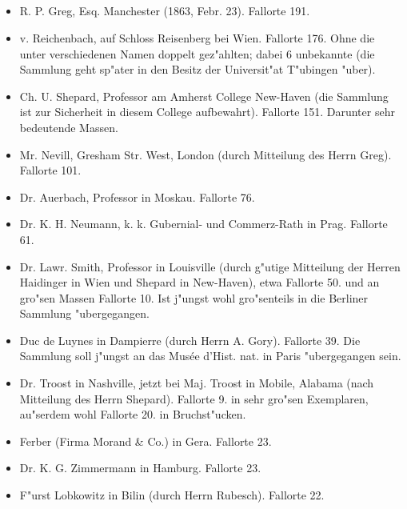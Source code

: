\documentclass[a4paper, 11pt, oneside]{article}
\begin{document}
\subsection*{}
\begin{itemize}
    \item R. P. Greg, Esq. Manchester (1863, Febr. 23). Fallorte 191.

    \item v. Reichenbach, auf Schloss Reisenberg bei Wien. Fallorte 176. Ohne die unter verschiedenen Namen doppelt gez"ahlten; dabei 6 unbekannte (die Sammlung geht sp"ater in den Besitz der Universit"at T"ubingen "uber).

    \item Ch. U. Shepard, Professor am Amherst College New-Haven (die Sammlung ist zur Sicherheit in diesem College aufbewahrt). Fallorte 151. Darunter sehr bedeutende Massen.

    \item Mr. Nevill, Gresham Str. West, London (durch Mitteilung des Herrn Greg). Fallorte 101.

    \item Dr. Auerbach, Professor in Moskau. Fallorte 76.

    \item Dr. K. H. Neumann, k. k. Gubernial- und Commerz-Rath in Prag. Fallorte 61.

    \item Dr. Lawr. Smith, Professor in Louisville (durch g"utige Mitteilung der Herren Haidinger in Wien und Shepard in New-Haven), etwa Fallorte 50. und an gro"sen Massen Fallorte 10. Ist j"ungst wohl gro"senteils in die Berliner Sammlung "ubergegangen.

    \item Duc de Luynes in Dampierre (durch Herrn A. Gory). Fallorte 39. Die Sammlung soll j"ungst an das Musée d'Hist. nat. in Paris "ubergegangen sein.

    \item Dr. Troost in Nashville, jetzt bei Maj. Troost in Mobile, Alabama (nach Mitteilung des Herrn Shepard). Fallorte 9. in sehr gro"sen Exemplaren, au"serdem wohl Fallorte 20. in Bruchst"ucken.

    \item Ferber (Firma Morand \& Co.) in Gera. Fallorte 23.

    \item Dr. K. G. Zimmermann in Hamburg. Fallorte 23.

    \item F"urst Lobkowitz in Bilin (durch Herrn Rubesch). Fallorte 22.


\end{itemize}
\end{document}
